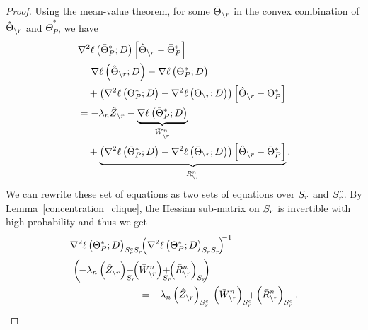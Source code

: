 \begin{proof}
Using the mean-value theorem, for some $\bar{\Theta}_{\backslash r}$ in the convex combination of $\hat{\Theta}_{\backslash r}$ and $\bar{\Theta}^*_P$, we have
\begin{equation}
\begin{aligned}
&\nabla^2\ell\left(\bar{\Theta}^*_P;D\right)\left[\hat{\Theta}_{\backslash r}-\bar{\Theta}^*_P\right]\\ &=\nabla\ell\left(\hat{\Theta}_{\backslash r};D\right)-\nabla\ell\left(\bar{\Theta}^*_P;D\right)\\ &\quad+\left(\nabla^2\ell\left(\bar{\Theta}^*_P;D\right)-\nabla^2\ell\left(\bar{\Theta}_{\backslash r};D\right)\right)\left[\hat{\Theta}_{\backslash r}-\bar{\Theta}^*_P\right]\\
&=-\lambda_n\hat{Z}_{\backslash r}-\underbrace{\nabla\ell\left(\bar{\Theta}^*_P;D\right)}_{\bar{W}_{\backslash r}^n}\\ &\quad+\underbrace{\left(\nabla^2\ell\left(\bar{\Theta}^*_P;D\right)-\nabla^2\ell\left(\bar{\Theta}_{\backslash r};D\right)\right) \left[\hat{\Theta}_{\backslash r}-\bar{\Theta}^*_P\right]}_{\bar{R}_{\backslash r}^n}.\\
\end{aligned}
\nonumber
\end{equation}
We can rewrite these set of equations as two sets of equations over $S_{r}$ and $S_{r}^c$. By Lemma~\ref{concentration_clique}, the Hessian sub-matrix on $S_{r}$ is invertible with high probability and thus we get
\begin{equation}
\begin{aligned}
&\nabla^2\ell\left(\bar{\Theta}^*_P;D\right)_{\support_\svert^c\support_\svert}\!\! \left(\nabla^2\ell\left(\bar{\Theta}^*_P;D\right)_{\support_\svert\support_\svert}\!\right)^{\!\!-1}\\ &\,\left(\!-\regpar_n\left(\hat{\dual}_{\backslash\svert}\right)_{\support_\svert}\!\!\!\!\!\!\! -\!\!\left(\bar{W}_{\backslash\svert}^n\right)_{\support_\svert}\!\!\!\!\!\!\! +\!\!\left(\bar{R}_{\backslash\svert}^n\right)_{\support_\svert}\!\!\right)\\ &\qquad\qquad\qquad\quad=-\regpar_n\left(\hat{\dual}_{\backslash\svert}\right)_{\support_\svert^c}\!\!\!\! -\!\left(\bar{W}_{\backslash\svert}^n\right)_{\support_\svert^c}\!\!\!\! +\!\left(\bar{R}_{\backslash\svert}^n\right)_{\support_\svert^c}.
\end{aligned}
\nonumber

\end{equation}
\end{proof}
